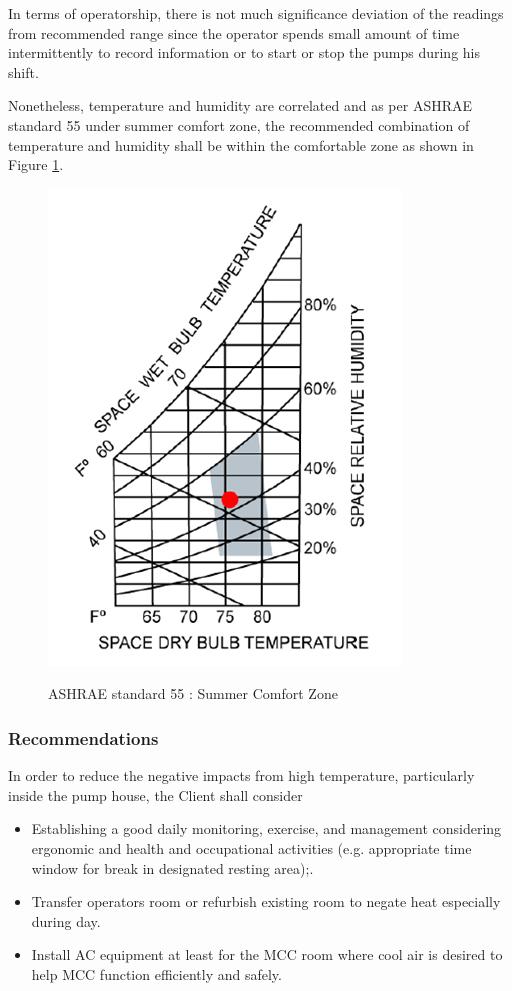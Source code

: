 In terms of operatorship, there is not much significance deviation of the readings from recommended range since the operator spends small amount of time intermittently to record information or to start or stop the pumps during his shift.

Nonetheless, temperature and humidity are correlated and as per ASHRAE standard 55 under summer comfort zone, the recommended combination of temperature and humidity shall be within the comfortable zone as shown in Figure \ref{fig_ch047_ashrae_psychrometrics}.

\begin{figure}[!htb]
	\includegraphics[scale=2]{figures/fig_ch047_ashrae_psychrometrics} \\
	\caption{ASHRAE standard 55 : Summer Comfort Zone}
	\label{fig_ch047_ashrae_psychrometrics} 
\end{figure} 

\subsubsection{Recommendations}
In order to reduce the negative impacts from high temperature, particularly inside the pump house, the Client shall consider

\begin{itemize}
	\item Establishing a good daily monitoring, exercise, and management considering ergonomic and health and occupational activities (e.g. appropriate time window for break in designated resting area);.
	\item Transfer operators room or refurbish existing room to negate heat especially during day.
	\item Install AC equipment at least for the MCC room where cool air is desired to help MCC function efficiently and safely.  
\end{itemize}

